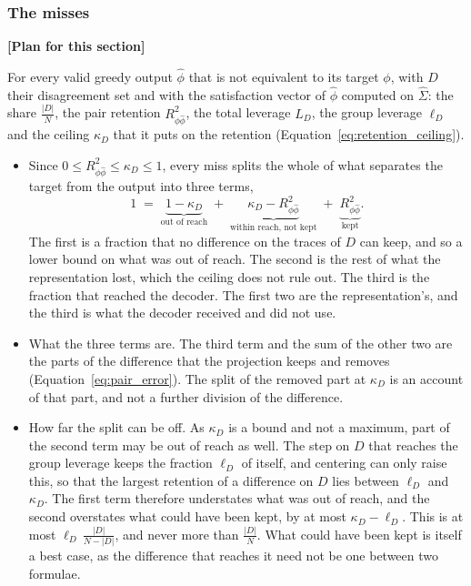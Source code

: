 \documentclass[titlepage,a4paper,11pt]{report}
\newenvironment{RSplan}{\par\medskip\color{orange!85!black}\noindent\textbf{[Plan for this section]}\par}{\par\medskip}
\begin{document}
    \subsubsection{The misses}
    \begin{RSplan}
    For every valid greedy output $\hat\phi$ that is not equivalent to its target $\phi$, with $D$ their disagreement set and with the satisfaction vector of $\hat\phi$ computed on $\widehat\Sigma$: the share $\frac{|D|}{N}$, the pair retention $R^2_{\phi\hat\phi}$, the total leverage $L_D$, the group leverage $\ell_D$ and the ceiling $\kappa_D$ that it puts on the retention (Equation~\eqref{eq:retention_ceiling}).
    \begin{itemize}
        \item Since $0\le R^2_{\phi\hat\phi}\le\kappa_D\le1$, every miss splits the whole of what separates the target from the output into three terms,
        \begin{equation}\label{eq:miss_terms}
            1\;=\;\underbrace{1-\kappa_D}_{\text{out of reach}}
            \;+\;\underbrace{\kappa_D-R^2_{\phi\hat\phi}}_{\text{within reach, not kept}}
            \;+\;\underbrace{R^2_{\phi\hat\phi}}_{\text{kept}} .
        \end{equation}
        The first is a fraction that no difference on the traces of $D$ can keep, and so a lower bound on what was out of reach. The second is the rest of what the representation lost, which the ceiling does not rule out. The third is the fraction that reached the decoder. The first two are the representation's, and the third is what the decoder received and did not use.
        \item What the three terms are. The third term and the sum of the other two are the parts of the difference that the projection keeps and removes (Equation~\eqref{eq:pair_error}). The split of the removed part at $\kappa_D$ is an account of that part, and not a further division of the difference.
        \item How far the split can be off. As $\kappa_D$ is a bound and not a maximum, part of the second term may be out of reach as well. The step on $D$ that reaches the group leverage keeps the fraction $\ell_D$ of itself, and centering can only raise this, so that the largest retention of a difference on $D$ lies between $\ell_D$ and $\kappa_D$. The first term therefore understates what was out of reach, and the second overstates what could have been kept, by at most $\kappa_D-\ell_D$. This is at most $\ell_D\,\frac{|D|}{N-|D|}$, and never more than $\frac{|D|}{N}$. What could have been kept is itself a best case, as the difference that reaches it need not be one between two formulae.

\end{itemize}
\end{RSplan}
\end{document}
